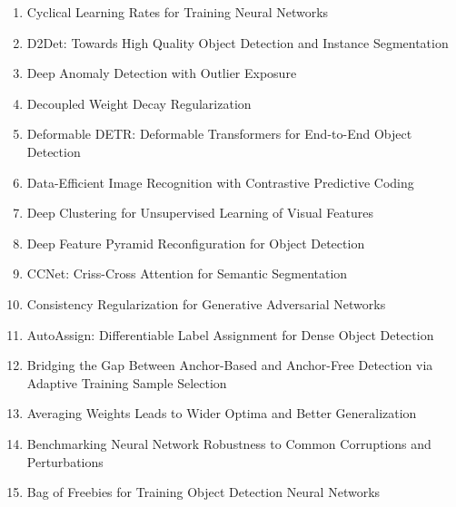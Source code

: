 \documentclass[acmlarge]{acmart}
\begin{document}
\begin{enumerate}
	\item Cyclical Learning Rates for Training Neural Networks \cite{Smith2017CyclicalLR} 

	\item D2Det: Towards High Quality Object Detection and Instance Segmentation \cite{Cao2020D2DetTH} 

	\item Deep Anomaly Detection with Outlier Exposure \cite{Hendrycks2019DeepAD} 

	\item Decoupled Weight Decay Regularization \cite{Loshchilov2019DecoupledWD} 

	\item Deformable DETR: Deformable Transformers for End-to-End Object Detection \cite{Zhu2021DeformableDD} 

	\item Data-Efficient Image Recognition with Contrastive Predictive Coding \cite{Hnaff2020DataEfficientIR} 

	\item Deep Clustering for Unsupervised Learning of Visual Features \cite{Caron2018DeepCF} 

	\item Deep Feature Pyramid Reconfiguration for Object Detection \cite{Kong2018DeepFP} 

	\item CCNet: Criss-Cross Attention for Semantic Segmentation \cite{Huang2019CCNetCA} 

	\item Consistency Regularization for Generative Adversarial Networks \cite{Zhang2020ConsistencyRF} 

	\item AutoAssign: Differentiable Label Assignment for Dense Object Detection \cite{Zhu2020AutoAssignDL} 

	\item Bridging the Gap Between Anchor-Based and Anchor-Free Detection via Adaptive Training Sample Selection \cite{Zhang2020BridgingTG} 

	\item Averaging Weights Leads to Wider Optima and Better Generalization \cite{Izmailov2018AveragingWL} 

	\item Benchmarking Neural Network Robustness to Common Corruptions and Perturbations \cite{Hendrycks2019BenchmarkingNN} 

	\item Bag of Freebies for Training Object Detection Neural Networks \cite{Zhang2019BagOF} 


\end{enumerate}
\end{document}
